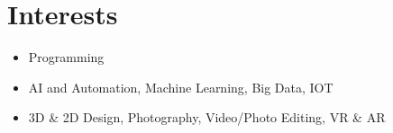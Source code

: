 \documentclass{resume}
\begin{document}
\section{Interests}
    \begin{itemize}
        \item Programming
        \item AI and Automation, Machine Learning, Big Data, IOT
        \item 3D \& 2D Design, Photography, Video/Photo Editing, VR \& AR
    \end{itemize}
\end{document}
